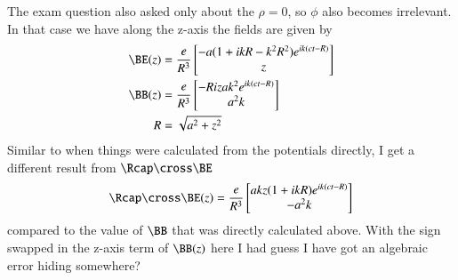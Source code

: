 {The exam question also asked only about the \(\rho = 0\), so \(\phi\) also becomes irrelevant.  In that case we have along the z-axis the fields are given by
%
\begin{equation}\label{eqn:relativisticElectrodynamicsExamReflection:1020}
\begin{aligned}
\BE(z)
&=
\frac{e}{R^3}
\begin{bmatrix}
- a (1 + i k R - k^2 R^2 ) e^{i k (c t - R)} \\
z
\end{bmatrix} \\
\BB(z)
&=
\frac{e}{R^3}
\begin{bmatrix}
-R i z a k^2 e^{i k (c t - R)} \\
a^2 k
\end{bmatrix} \\
R &= \sqrt{a^2 + z^2}
\end{aligned}
\end{equation}
%
Similar to when things were calculated from the potentials directly, I get a different result from \(\Rcap \cross \BE\)
%
\begin{equation}\label{eqn:relativisticElectrodynamicsExamReflection:1030}
\Rcap \cross \BE(z) = \frac{e}{R^3}
\begin{bmatrix}
a k z (1 + i k R) e^{i k (c t - R)} \\
-a^2 k
\end{bmatrix}
\end{equation}
%
compared to the value of \(\BB\) that was directly calculated above.  With the sign swapped in the z-axis term of \(\BB(z)\) here I had guess I have got an algebraic error hiding somewhere?

} %


